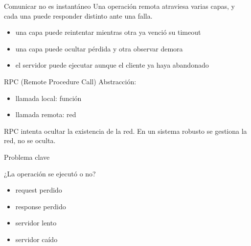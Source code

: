 \documentclass[institutional,screen,none]{ua-engineering-v6-beamer}
\begin{document}
\begin{frame}{Comunicar no es instantáneo}
Una operación remota atraviesa varias capas, y cada una puede responder distinto ante una falla.

\vspace{-0.3em}
\begin{center}
\end{center}
\vspace{-0.2em}

\begin{itemize}
\item una capa puede reintentar mientras otra ya venció su timeout
\item una capa puede ocultar pérdida y otra observar demora
\item el servidor puede ejecutar aunque el cliente ya haya abandonado
\end{itemize}
\end{frame}

\begin{frame}{RPC (Remote Procedure Call)}
Abstracción:

\begin{itemize}
\item llamada local: función
\item llamada remota: red
\end{itemize}

\begin{uawarn}
RPC intenta ocultar la existencia de la red. En un sistema robusto se gestiona la red, no se oculta.
\end{uawarn}
\end{frame}

\begin{frame}{Problema clave}
\begin{center}
\Large
¿La operación se ejecutó o no?
\end{center}

\begin{itemize}
\item request perdido
\item response perdido
\item servidor lento
\item servidor caído
\end{itemize}
\end{frame}
\end{document}
